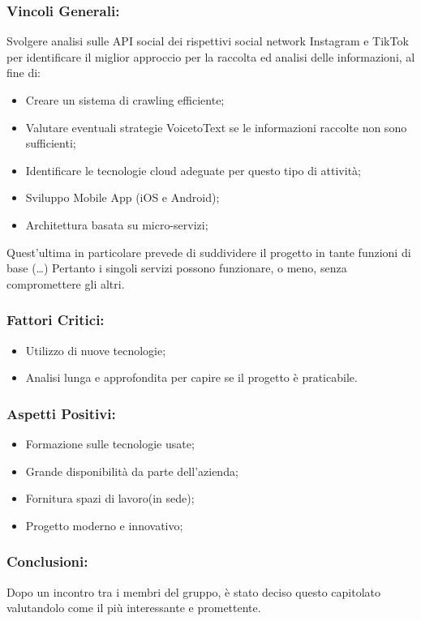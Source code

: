 \subsubsection{Vincoli Generali:}
Svolgere analisi sulle API social dei rispettivi social network Instagram e TikTok per identificare il miglior approccio per la raccolta ed analisi delle informazioni, al fine di:
\begin{itemize}
	\item Creare un sistema di crawling efficiente;
	\item Valutare eventuali strategie VoicetoText se le informazioni raccolte non sono sufficienti;
	\item Identificare le tecnologie cloud adeguate per questo tipo di attività;
	\item Sviluppo Mobile App (iOS e Android);
	\item Architettura basata su micro-servizi; 
\end{itemize}
Quest'ultima in particolare prevede di suddividere il progetto in tante funzioni di base (…) Pertanto i singoli servizi possono funzionare, o meno, senza compromettere gli altri.

\subsubsection{Fattori Critici:}
\begin{itemize}
	\item Utilizzo di nuove tecnologie;
	\item Analisi lunga e approfondita per capire se il progetto è praticabile.
\end{itemize}

\subsubsection{Aspetti Positivi:}
\begin{itemize}
	\item Formazione sulle tecnologie usate;
	\item Grande disponibilità da parte dell'azienda;
	\item Fornitura spazi di lavoro(in sede);
	\item Progetto moderno e innovativo; 
\end{itemize}

\subsubsection{Conclusioni:}
Dopo un incontro tra i membri del gruppo, è stato deciso questo capitolato valutandolo come il più interessante e promettente.